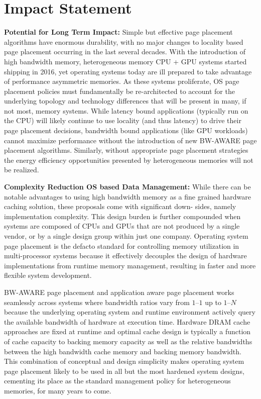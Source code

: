 \section{Impact Statement}
\textbf{Potential for Long Term Impact:} Simple but effective page placement algorithms
have enormous durability, with no major changes to locality based page
placement occurring in the last several decades. With the introduction of high
bandwidth memory, heterogeneous memory CPU + GPU systems started shipping in
2016, yet operating systems today are ill prepared to take advantage of
performance asymmetric memories. As these systems proliferate, OS page placement
policies must fundamentally be re-architected to account for the underlying
topology and technology differences that will be present in many, if not most,
memory systems. While latency bound applications (typically run on the CPU)
will likely continue to use locality (and thus latency) to drive their page
placement decisions, bandwidth bound applications (like GPU workloads) cannot
maximize performance without the introduction of new BW-AWARE page placement
algorithms. Similarly, without appropriate page placement strategies the
energy efficiency opportunities presented by heterogeneous memories will not
be realized.

\textbf{Complexity Reduction OS based Data Management:}
While there can be notable advantages to using high bandwidth memory as a fine
grained hardware caching solution, these proposals come with significant down-
sides, namely implementation complexity. This design burden is further
compounded when systems are composed of CPUs and GPUs that are not produced by
a single vendor, or by a single design group within just one company. Operating
system page placement is the defacto standard for controlling memory utilization
in multi-processor systems because it effectively decouples the design of
hardware implementations from runtime memory management, resulting in faster and
more flexible system development.

BW-AWARE page placement and application aware page placement works seamlessly
across systems where bandwidth ratios vary from $1–1$ up to $1–N$ because
the underlying operating system and runtime environment actively query the
available bandwidth of hardware at execution time. Hardware DRAM cache
approaches are fixed at runtime and optimal cache design is typically a
function of cache capacity to backing memory capacity as well as the relative
bandwidths between the high bandwidth cache memory and backing memory
bandwidth. This combination of conceptual and design simplicity makes
operating system page placement likely to be used in all but the most hardened
system designs, cementing its place as the standard management policy for
heterogeneous memories, for many years to come.


